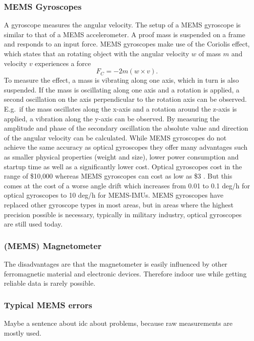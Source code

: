 \subsubsection{MEMS Gyroscopes}
A gyroscope measures the angular velocity.
The setup of a MEMS gyroscope is similar to that of a MEMS accelerometer.
A proof mass is suspended on a frame and responds to an input force.
MEMS gyroscopes make use of the Coriolis effect, which states that an rotating object with the angular velocity $w$ of mass $m$ and velocity $v$ experiences a force
\[ F_C = -2m(w\times v). \]
To measure the effect, a mass is vibrating along one axis, which in turn is also suspended.
If the mass is oscillating along one axis and a rotation is applied, a second oscillation on the axis perpendicular to the rotation axis can be observed.
E.g.\ if the mass oscillates along the x-axis and a rotation around the z-axis is applied, a vibration along the y-axis can be observed.
By measuring the amplitude and phase of the secondary oscillation the absolute value and direction of the angular velocity can be calculated.
While MEMS gyroscopes do not achieve the same accuracy as optical gyroscopes they offer many advantages such as smaller physical properties (weight and size), lower power consumption and startup time as well as a significantly lower cost.
Optical gyroscopes cost in the range of \$10,000 whereas MEMS gyroscopes can cost as low as \$3 \cite{Perlmutter2016}.
But this comes at the cost of a worse angle drift which increases from 0.01 to 0.1 deg/h  for optical gyroscopes to 10 deg/h  for MEMS-IMUs.
MEMS gyroscopes have replaced other gyroscope types in most areas, but in areas where the highest precision possible is necessary, typically in military industry, optical gyroscopes are still used today.

\subsubsection{(MEMS) Magnetometer}
The disadvantages are that the magnetometer is easily influenced by other ferromagnetic material and electronic devices.
Therefore indoor use while getting reliable data is rarely possible.

\subsubsection{Typical MEMS errors}
Maybe a sentence about idc about problems, because raw measurements are mostly used.

